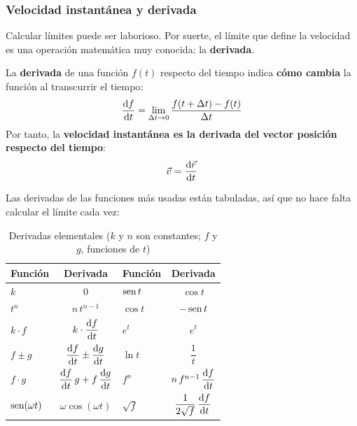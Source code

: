 \subsubsection{Velocidad instantánea y derivada}

Calcular límites puede ser laborioso. Por suerte, el límite que define la velocidad es una operación matemática muy conocida: la
\textbf{derivada}.

\begin{definition}[Derivada]
    La \textbf{derivada} de una función \(f(t)\) respecto del tiempo indica \textbf{cómo cambia} la función al transcurrir el
    tiempo:
    \[ \frac{\mathrm{d} f}{\mathrm{d} t} = \lim_{\Delta t \to 0} \frac{f(t + \Delta t) - f(t)}{\Delta t} \]
    Por tanto, la \textbf{velocidad instantánea es la derivada del vector posición respecto del tiempo}:
    \[ \vec v = \frac{\mathrm{d}\vec r}{\mathrm{d} t} \]
\end{definition}

Las derivadas de las funciones más usadas están tabuladas, así que no hace falta calcular el límite cada vez:

\begin{table}[H]
    \centering
    \caption{Derivadas elementales (\(k\) y \(n\) son constantes; \(f\) y \(g\), funciones de \(t\))}
    \vspace{-5pt}
    \begin{tabular}{@{}lclc@{}}
        \toprule
        \textbf{Función} & \textbf{Derivada} & \textbf{Función} & \textbf{Derivada} \\
        \midrule
        \(k\) & \(0\) & \(\operatorname{sen} t\) & \(\cos t\) \\[3pt]
        \(t^n\) & \(n\,t^{n - 1}\) & \(\cos t\) & \(-\operatorname{sen} t\) \\[3pt]
        \(k \cdot f\) & \(k \cdot \dfrac{\mathrm{d} f}{\mathrm{d} t}\) & \(e^t\) & \(e^t\) \\[8pt]
        \(f \pm g\) & \(\dfrac{\mathrm{d} f}{\mathrm{d} t} \pm \dfrac{\mathrm{d} g}{\mathrm{d} t}\) & \(\ln t\) & \(\dfrac{1}{t}\) \\[8pt]
        \(f \cdot g\) & \(\dfrac{\mathrm{d} f}{\mathrm{d} t}\,g + f\,\dfrac{\mathrm{d} g}{\mathrm{d} t}\) & \(f^n\) & \(n\,f^{n - 1}\,\dfrac{\mathrm{d} f}{\mathrm{d} t}\) \\[8pt]
        \(\operatorname{sen}(\omega t)\) & \(\omega\cos(\omega t)\) & \(\sqrt f\) & \(\dfrac{1}{2\sqrt f}\,\dfrac{\mathrm{d} f}{\mathrm{d} t}\) \\
        \bottomrule
    \end{tabular}
    \label{tab:ud8-derivadas}
\end{table}

